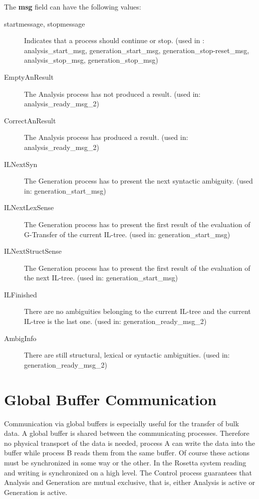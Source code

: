 The {\bf msg} field can have the following values:
\begin{description}
  \item[startmessage, stopmessage] Indicates that a process should continue or
                 stop. (used in : analysis\_start\_msg,
                                  generation\_start\_msg,
                                  generation\_stop-reset\_msg,
                                  analysis\_stop\_msg,
                                  generation\_stop\_msg)
  \item[EmptyAnResult] The Analysis process has not produced a result.
                        (used in: analysis\_ready\_msg\_2)
  \item[CorrectAnResult] The Analysis process has produced a result.
                        (used in: analysis\_ready\_msg\_2)
  \item[ILNextSyn] The Generation process has to present the next syntactic
                   ambiguity.
                        (used in: generation\_start\_msg)
  \item[ILNextLexSense] The Generation process has to present the first 
                result
                of the evaluation of G-Transfer of the current IL-tree.
                        (used in: generation\_start\_msg)
  \item[ILNextStructSense] The Generation process has to present the first 
                result
                of the evaluation of the next IL-tree.
                        (used in: generation\_start\_msg)
  \item[ILFinished] There are no ambiguities belonging to the current
                 IL-tree and the current IL-tree is the last one.
                 (used in: generation\_ready\_msg\_2)
  \item[AmbigInfo] There are still structural, lexical or syntactic
                 ambiguities.
                 (used in: generation\_ready\_msg\_2)
\end{description}
\section{Global Buffer Communication}
Communication via global buffers is especially useful for the transfer
of bulk data. A global buffer is shared between the communicating processes.
Therefore no physical transport of the data is needed, process A can write
the data into the buffer while process B reads them from the same buffer. Of
course these actions must be synchronized in some way or the other. In the
Rosetta system reading and writing is synchronized on a high level.
The Control process guarantees that Analysis and Generation are mutual 
exclusive, that is, either Analysis is active or Generation is active.

